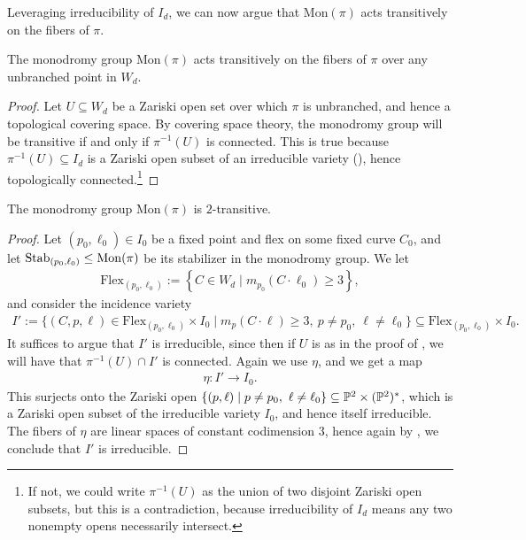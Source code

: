 \documentclass[11pt]{amsart}
\providecommand{\Flex}{\mathrm{Flex}}
\providecommand{\Mon}{\mathrm{Mon}}
\begin{document}
Leveraging irreducibility of $I_d$, we can now argue that $\Mon(\pi)$ acts transitively on the fibers of $\pi$.

\begin{proposition}\label{prop:monodromy-flexes-transitive} 
The monodromy group $\Mon(\pi)$ acts transitively on the fibers of $\pi$ over any unbranched point in $W_d$.
\end{proposition}
\begin{proof} Let $U \subseteq W_d$ be a Zariski open set over which $\pi$ is unbranched, and hence a topological covering space. By covering space theory, the monodromy group will be transitive if and only if $\pi^{-1}(U)$ is connected. This is true because $\pi^{-1}(U) \subseteq I_d$ is a Zariski open subset of an irreducible variety (), hence topologically connected.\footnote{%
If not, we could write $\pi^{-1}(U)$ as the union of two disjoint Zariski open subsets, but this is a contradiction, because irreducibility of $I_d$ means any two nonempty opens necessarily intersect.} 
\end{proof}


\begin{proposition} The monodromy group $\Mon(\pi)$ is $2$-transitive.
\end{proposition}
\begin{proof} Let $(p_0,\ell_0) \in I_0$ be a fixed point and flex on some fixed curve $C_0$, and let $\Stab_{(p_0,\ell_0)} \le \Mon(\pi)$ be its stabilizer in the monodromy group. We let
\begin{align*}
    \Flex_{(p_0,\ell_0)} := \left\{ C\in W_d \mid m_{p_0}(C\cdot \ell_0)\ge 3 \right\},
\end{align*}
and consider the incidence variety 
\begin{align*}
    I' := \{(C,p,\ell)\in \Flex_{(p_0,\ell_0)} \times I_0 \mid m_p(C\cdot \ell) \ge 3,\ p\ne p_0,\ \ell\ne \ell_0\} \subseteq \Flex_{(p_0,\ell_0)} \times I_0.
\end{align*}
It suffices to argue that $I'$ is irreducible, since then if $U$ is as in the proof of , we will have that $\pi^{-1}(U) \cap I'$ is connected. Again we use $\eta$, and we get a map
\begin{align*}
    \eta \colon I' \to I_0.
\end{align*}
This surjects onto the Zariski open $\left\{ (p,\ell) \mid p\ne p_0,\ \ell\ne \ell_0 \right\} \subseteq \P^2 \times (\P^2)^\ast$, which is a Zariski open subset of the irreducible variety $I_0$, and hence itself irreducible. The fibers of $\eta$ are linear spaces of constant codimension $3$, hence again by , we conclude that $I'$ is irreducible.
\end{proof}
\end{document}
